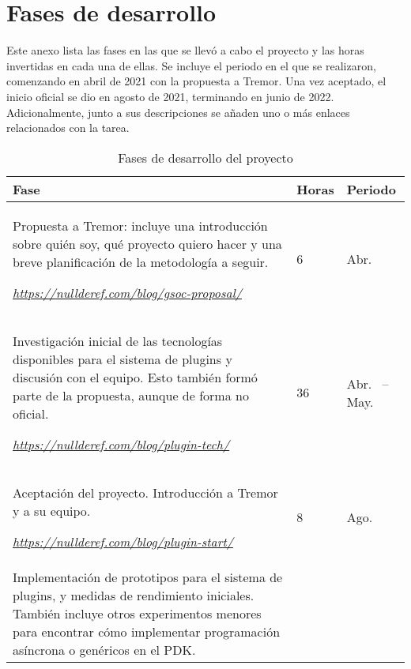\chapter{Fases de desarrollo}\label{annex:hours}

Este anexo lista las fases en las que se llevó a cabo el proyecto y las horas
invertidas en cada una de ellas. Se incluye el periodo en el que se realizaron,
comenzando en abril de 2021 con la propuesta a Tremor. Una vez aceptado, el
inicio oficial se dio en agosto de 2021, terminando en junio de 2022.
Adicionalmente, junto a sus descripciones se añaden uno o más enlaces
relacionados con la tarea.


\begin{longtable}[H]{| m{9.7cm} | P{1.3cm} | P{3.4cm} |}
\caption{Fases de desarrollo del proyecto}\\

\hline
\textbf{Fase}
    & \textbf{Horas}
    & \textbf{Periodo} \\
\hline
\endhead

Propuesta a Tremor: incluye una introducción sobre quién soy, qué proyecto
quiero hacer y una breve planificación de la metodología a seguir.

\vspace{4mm}
\emph{\url{https://nullderef.com/blog/gsoc-proposal/}}
    & 6
    & Abr.~ \\

\hline
Investigación inicial de las tecnologías disponibles para el sistema de
plugins y discusión con el equipo. Esto también formó parte de la propuesta,
aunque de forma no oficial.

\vspace{4mm}
\emph{\url{https://nullderef.com/blog/plugin-tech/}}
    & 36
    & Abr.~ -- May.~ \\

\hline
Aceptación del proyecto. Introducción a Tremor y a su equipo.

\vspace{4mm}
\emph{\url{https://nullderef.com/blog/plugin-start/}}
    & 8
    & Ago.~ \\

\hline
Implementación de prototipos para el sistema de plugins, y medidas de
rendimiento iniciales. También incluye otros experimentos menores para encontrar
cómo implementar programación asíncrona o genéricos en el PDK.


\end{longtable}
